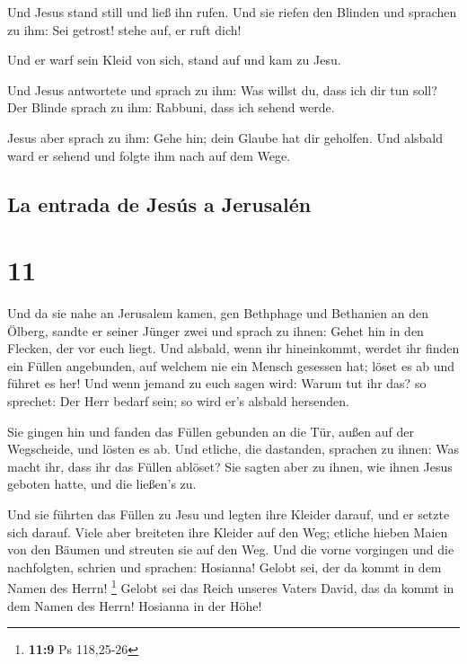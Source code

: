  Und Jesus stand still und ließ ihn rufen. Und sie riefen
den Blinden und sprachen zu ihm: Sei getrost! stehe auf, er ruft dich!

 Und er warf sein Kleid von sich, stand auf und kam zu
Jesu.

 Und Jesus antwortete und sprach zu ihm: Was willst du,
dass ich dir tun soll? Der Blinde sprach zu ihm: Rabbuni, dass ich
sehend werde.

 Jesus aber sprach zu ihm: Gehe hin; dein Glaube hat dir
geholfen. Und alsbald ward er sehend und folgte ihm nach auf dem Wege.

\hypertarget{la-entrada-de-jesuxfas-a-jerusaluxe9n}{%
\subsection{La entrada de Jesús a
Jerusalén}\label{la-entrada-de-jesuxfas-a-jerusaluxe9n}}

\hypertarget{section-10}{%
\section{11}\label{section-10}}

 Und da sie nahe an Jerusalem kamen, gen Bethphage und
Bethanien an den Ölberg, sandte er seiner Jünger zwei  und
sprach zu ihnen: Gehet hin in den Flecken, der vor euch liegt. Und
alsbald, wenn ihr hineinkommt, werdet ihr finden ein Füllen angebunden,
auf welchem nie ein Mensch gesessen hat; löset es ab und führet es her!
 Und wenn jemand zu euch sagen wird: Warum tut ihr das? so
sprechet: Der Herr bedarf sein; so wird er's alsbald hersenden.

 Sie gingen hin und fanden das Füllen gebunden an die Tür,
außen auf der Wegscheide, und lösten es ab.  Und etliche,
die dastanden, sprachen zu ihnen: Was macht ihr, dass ihr das Füllen
ablöset?  Sie sagten aber zu ihnen, wie ihnen Jesus
geboten hatte, und die ließen's zu.

 Und sie führten das Füllen zu Jesu und legten ihre
Kleider darauf, und er setzte sich darauf.  Viele aber
breiteten ihre Kleider auf den Weg; etliche hieben Maien von den Bäumen
und streuten sie auf den Weg.  Und die vorne vorgingen und
die nachfolgten, schrien und sprachen: Hosianna! Gelobt sei, der da
kommt in dem Namen des Herrn! \footnote{\textbf{11:9} Ps 118,25-26}
 Gelobt sei das Reich unseres Vaters David, das da kommt
in dem Namen des Herrn! Hosianna in der Höhe!

